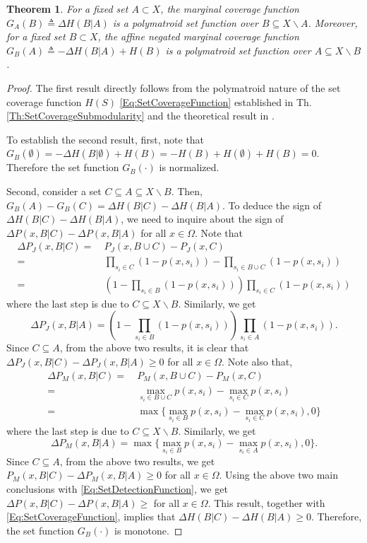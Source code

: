 \documentclass[letterpaper, 10 pt, conference]{ieeeconf}
\newtheorem{theorem}{Theorem}
\begin{document}
\begin{theorem}\label{Th:SubmodularityOfMarginalCoverage}
For a fixed set $A \subset X$, the marginal coverage function $G_A(B) \triangleq \Delta H (B \vert A)$ is a polymatroid set function over $B \subseteq X \backslash A$. Moreover, for a fixed set $B \subset X$, the affine negated marginal coverage function $G_B(A) \triangleq -\Delta H (B \vert A)+H(B)$ is a polymatroid set function over $A \subseteq X \backslash B$.
\end{theorem} 
\begin{proof}
The first result directly follows from the polymatroid nature of the set coverage function $H(S)$  \eqref{Eq:SetCoverageFunction} established in Th. \ref{Th:SetCoverageSubmodularity} and the theoretical result in \cite[Lm. 1]{WelikalaJ02021}.

To establish the second result, first, note that $G_B(\emptyset) = -\Delta H (B \vert \emptyset)+H(B) = -H(B)+H(\emptyset)+H(B) = 0$. Therefore the set function $G_B(\cdot)$ is normalized. 

Second, consider a set $C \subseteq A \subseteq X\backslash B$. Then, 
$G_B(A)-G_B(C) = \Delta H (B \vert C) - \Delta H (B \vert A)$. To deduce the sign of $\Delta H (B \vert C) - \Delta H (B \vert A)$, we need to inquire about the sign of $\Delta P(x,B\vert C) - \Delta P(x, B \vert A)$ for all $x \in \Omega$. Note that
\begin{align*}
\Delta P_J(x,B\vert C) 
=&\ P_J(x,B\cup C) - P_J(x,C) \\
=&\ \prod_{s_i\in C}(1-p(x,s_i)) - \prod_{s_i\in B\cup C} (1-p(x,s_i))\\
=&\ (1-\prod_{s_i\in B}(1-p(x,s_i)))\prod_{s_i\in C} (1-p(x,s_i))
\end{align*}
where the last step is due to $C\subseteq X \backslash B$. Similarly, we get 
$$
\Delta P_J(x,B\vert A) = (1-\prod_{s_i\in B}(1-p(x,s_i)))\prod_{s_i\in A} (1-p(x,s_i)).
$$
Since $C\subseteq A$, from the above two results, it is clear that $\Delta P_J(x,B\vert C) - \Delta P_J(x, B \vert A) \geq 0$ for all $x \in \Omega$. 
Note also that,
\begin{align*}
    \Delta P_M(x,B \vert C) =&\ P_M(x,B\cup C) - P_M(x,C)\\
    =&\ \max_{s_i \in B\cup C} p(x,s_i)  - \max_{s_i\in C} p(x,s_i)\\
    =&\ \max\{\max_{s_i \in B} p(x,s_i) - \max_{s_i \in C} p(x,s_i),0\}
\end{align*}
where the last step is due to $C\subseteq X \backslash B$. Similarly, we get 
$$
\Delta P_M(x,B \vert A) = 
\max\{\max_{s_i \in B} p(x,s_i) - \max_{s_i \in A} p(x,s_i),0\}.
$$
Since $C\subseteq A$, from the above two results, we get $P_M(x,B\vert C) - \Delta P_M(x, B \vert A) \geq 0$ for all $x \in \Omega$. Using the above two main conclusions with \eqref{Eq:SetDetectionFunction}, we get $\Delta P(x,B\vert C) - \Delta P(x, B \vert A)\geq$ for all $x \in \Omega$. This result, together with \eqref{Eq:SetCoverageFunction}, implies that $\Delta H (B \vert C) - \Delta H (B \vert A) \geq 0$. Therefore, the set function $G_B(\cdot)$ is monotone.


\end{proof}
\end{document}
